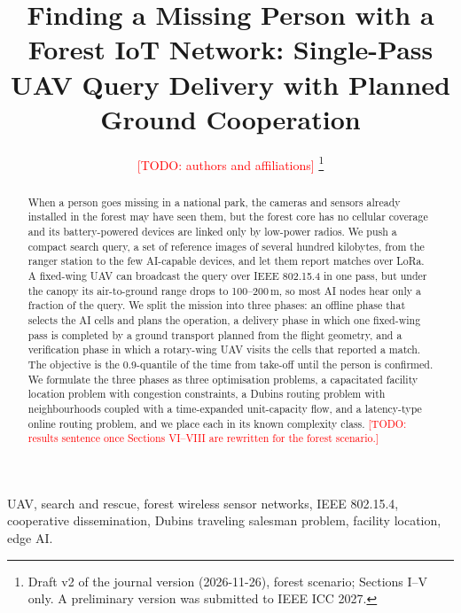 \documentclass[journal,10pt]{IEEEtran}
\theoremstyle{definition}
\theoremstyle{remark}
\newcommand{\todo}[1]{\textcolor{red}{[TODO: #1]}}
\begin{document}
\title{Finding a Missing Person with a Forest IoT Network: Single-Pass UAV Query Delivery with Planned Ground Cooperation}
\author{\todo{authors and affiliations}%
\thanks{Draft v2 of the journal version (2026-11-26), forest scenario; Sections I--V only. A preliminary version was
submitted to IEEE ICC 2027.}}
\maketitle

\begin{abstract}
When a person goes missing in a national park, the cameras and sensors already installed in the forest may have seen
them, but the forest core has no cellular coverage and its battery-powered devices are linked only by low-power radios.
We push a compact search query, a set of reference images of several hundred kilobytes, from the ranger station to the
few AI-capable devices, and let them report matches over LoRa. A fixed-wing UAV can broadcast the query over IEEE
802.15.4 in one pass, but under the canopy its air-to-ground range drops to 100--200\,m, so most AI nodes hear only a
fraction of the query. We split the mission into three phases: an offline phase that selects the AI cells and plans the
operation, a delivery phase in which one fixed-wing pass is completed by a ground transport planned from the flight
geometry, and a verification phase in which a rotary-wing UAV visits the cells that reported a match. The objective is
the 0.9-quantile of the time from take-off until the person is confirmed. We formulate the three phases as three
optimisation problems, a capacitated facility location problem with congestion constraints, a Dubins routing problem
with neighbourhoods coupled with a time-expanded unit-capacity flow, and a latency-type online routing problem, and we
place each in its known complexity class. \todo{results sentence once Sections VI--VIII are rewritten for the forest
scenario.}
\end{abstract}
\begin{IEEEkeywords}
UAV, search and rescue, forest wireless sensor networks, IEEE 802.15.4, cooperative dissemination, Dubins traveling
salesman problem, facility location, edge AI.
\end{IEEEkeywords}






\end{document}

